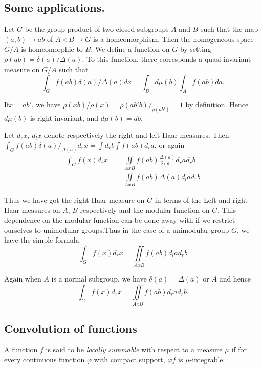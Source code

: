 \subsection{Some applications.}\label{partII-chap3-sec3.5}%
       
Let $G$ be the group product of two closed subgroups $A$ and $B$ such
that the map $(a,b)\rightarrow ab$ of $A\times B \rightarrow G$ is a
homeomorphism. Then the homogeneous space $G/A$ is homeomorphic to
$B$. We define a  function on $G$ by setting $\rho(ab)=\delta(a)/
\Delta  (a)$. To this function, there corresponds a quasi-invariant
measure on $G/A$ such that 
$$
\int_G f(ab) \delta (a)/ \Delta  (a)dx=\int_B d \mu (b) \int_A f(ab) d a.
$$

If\pageoriginale $x=ab'$, we have $\rho (xb)/{\rho (x)}=\rho (ab'b)/_{\rho 
  (ab')}=1$ by definition. Hence $d \mu (b)$ is right invariant, and
$d \mu (b)=db$. 

Let $d_r x$, $d_lx$  denote respectively the right and left
Haar measures. Then $\int_{G} f (ab) \delta (a)/_{\Delta  (a)}
d_{r}x= \int d_{r}b \int f (ab)d_{r}a$, or again 
\begin{align*}  
\int_{G}f(x)d_{r}x&=\iint\limits_{A x B} f (ab) \frac{\Delta 
  (a)} {\delta (a)} d_{r} a  d_{r}b\\ 
 &=\iint\limits_{A x B} f(ab) \Delta  (a) d_l a d_{r} b
\end{align*}

Thus we have got the right Haar measure on $G$ in terms of the Left
and right Haar measures on $A$, $B$ respectively and the modular
function on $G$. This dependence on the modular function can be done
away with if we restrict ourselves to unimodular groups.Thus in the
case of a unimodular group $G$, we have the simple formula 
$$
\int_{G}f(x)d_{r}x=\iint\limits_{A x B} f(ab) d_{l} a d_{r} b 
$$ 

Again when $A$ is a normal subgroup, we have $\delta (a) = \Delta 
(a) $ or $A$ and hence  
$$
\int_G f(x) d_r x= \iint\limits_{A x B}f (ab) d_r a d_r b. 
$$
   
\subsection{Convolution of functions}\label{partII-chap3-sec3.6}

\begin{defi*}%
 A function  $f$ is said to be {\em locally summable} with respect to
 a measure $\mu$ if for every continuous function $\varphi$ with
 compact support, $\varphi f$ is $\mu$-integrable. 
\end{defi*}

